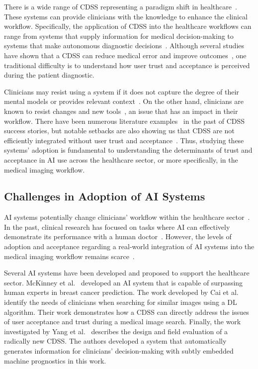 There is a wide range of CDSS representing a paradigm shift in healthcare~\cite{Cai:2019:HTC:3290605.3300234, edge2019clinical}.
These systems can provide clinicians with the knowledge to enhance the clinical workflow.
Specifically, the application of CDSS into the healthcare workflows can range from systems that supply information for medical decision-making to systems that make autonomous diagnostic decisions~\cite{hwang2019artificial}.
Although several studies have shown that a CDSS can reduce medical error and improve outcomes~\cite{Cai:2019:EEE:3301275.3302289, Cai:2019:HTC:3290605.3300234}, one traditional difficulty is to understand how user trust and acceptance is perceived during the patient diagnostic.

Clinicians may resist using a system if it does not capture the degree of their mental models or provides relevant context~\cite{khairat2018reasons, kohli2018cad, yang2016investigating}.
On the other hand, clinicians are known to resist changes and new tools~\cite{calisto2017mimbcdui, 10.1145/3132272.3134111, gagnon2014electronic}, an issue that has an impact in their workflow.
There have been numerous literature examples~\cite{eslami2012effects, jia2016effects} in the past of CDSS success stories, but notable setbacks are also showing us that CDSS are not efficiently integrated without user trust and acceptance~\cite{Sutton2020}.
Thus, studying these systems' adoption is fundamental to understanding the determinants of trust and acceptance in AI use across the healthcare sector, or more specifically, in the medical imaging workflow.

\subsection{Challenges in Adoption of AI Systems}
\label{sec:chap004002002}

AI systems potentially change clinicians' workflow within the healthcare sector~\cite{wallis2019artificial}.
In the past, clinical research has focused on tasks where AI can effectively demonstrate its performance with a human doctor~\cite{Buch143}.
However, the levels of adoption and acceptance regarding a real-world integration of AI systems into the medical imaging workflow remains scarce~\cite{Fan2020}.

Several AI systems have been developed and proposed to support the healthcare sector.
McKinney et al.~\cite{McKinney2020} developed an AI system that is capable of surpassing human experts in breast cancer prediction.
The work developed by Cai et al.~\cite{Cai:2019:HTC:3290605.3300234} identify the needs of clinicians when searching for similar images using a DL algorithm.
Their work demonstrates how a CDSS can directly address the issues of user acceptance and trust during a medical image search.
Finally, the work investigated by Yang et al.~\cite{10.1145/3290605.3300468} describes the design and field evaluation of a radically new CDSS.
The authors developed a system that automatically generates information for clinicians' decision-making with subtly embedded machine prognostics in this work.

